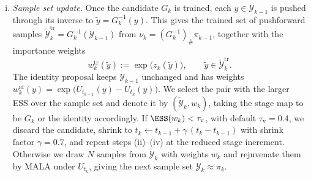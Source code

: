 \documentclass{article}
\begin{document}
\begin{enumerate}[(i)]
\item \emph{Sample set update.} Once the candidate $G_k$ is trained, each $y \in \mathcal Y_{k-1}$ is pushed through its inverse to $\tilde y = G_k^{-1}(y)$. This gives the trained set of pushforward samples $\tilde{\mathcal Y}_k^{\mathrm{tr}} = G_k^{-1}(\mathcal Y_{k-1})$ from $\nu_k = (G_k^{-1})_{\#}\pi_{k-1}$, together with the importance weights
\begin{equation*}
    w_k^{\mathrm{tr}}(\tilde y) := \exp\bigl(z_k(\tilde y)\bigr),
    \qquad \tilde y \in \tilde{\mathcal Y}_k^{\mathrm{tr}} .
\end{equation*}
The identity proposal keeps $\mathcal Y_{k-1}$ unchanged and has weights $w_k^{\mathrm{id}}(y)=\exp\big(U_{t_{k-1}}(y)-U_{t_k}(y)\big)$. We select the pair with the larger ESS over the sample set and denote it by $(\tilde{\mathcal Y}_k,w_k)$, taking the stage map to be $G_k$ or the identity accordingly. If $\ESS(w_k) < \tau_{\mathrm v}$, with default $\tau_{\mathrm v} = 0.4$, we discard the candidate, shrink to $t_k \gets t_{k-1} + \gamma\,(t_k - t_{k-1})$ with shrink factor $\gamma=0.7$, and repeat steps (ii)--(iv) at the reduced stage increment. Otherwise we draw $N$ samples from $\tilde{\mathcal Y}_k$ with weights $w_k$ and rejuvenate them by MALA under $U_{t_k}$, giving the next sample set $\mathcal Y_k\approx\pi_k$.
\end{enumerate}
\end{document}
